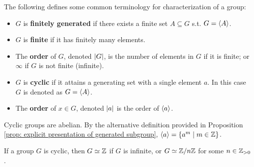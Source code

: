 \documentclass{article}
\begin{document}
\begin{definition}
    The following defines some common terminology for characterization of a group:
    \begin{itemize}
        \item $G$ is \textbf{finitely generated} if there exists a finite set $A \subseteq G$ s.t. $G = \left\langle A \right\rangle$.
        \item $G$ is \textbf{finite} if it has finitely many elements. 
        \item The \textbf{order} of $G$, denoted $\left|G\right|$, is the number of elements in $G$ if it is finite; or $\infty$ if $G$ is not finite (infinite).
        \item $G$ is \textbf{cyclic} if it attains a generating set with a single element $a$. In this case $G$ is denoted as $G = \left\langle A \right\rangle$.
        \item The \textbf{order} of $x \in G$, denoted $\left|a\right|$ is the order of $\left\langle a \right\rangle$.  
    \end{itemize}
\end{definition}

\begin{remark}
    Cyclic groups are abelian. By the alternative definition provided in Proposition \ref{prop: explicit presentation of generated subgroup}, $\left\langle a \right\rangle = \{ a^m \mid m \in \mathbb{Z} \}$.
\end{remark}

\begin{proposition}\label{prop: characterization of cyclic group}
    If a group $G$ is cyclic, then $G \simeq \mathbb{Z}$ if $G$ is infinite, or $G \simeq \mathbb{Z}/n\mathbb{Z}$ for some $n \in \mathbb{Z}_{>0}$.  
\end{proposition}
\end{document}
